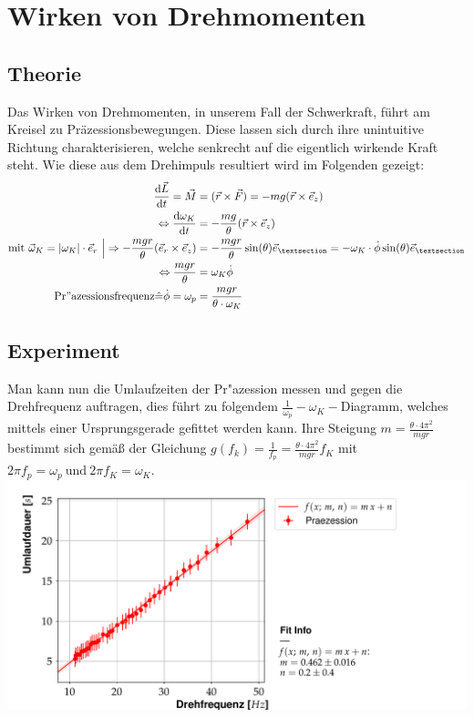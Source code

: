 \documentclass{include/protokollclass}
\begin{document}
    \chapter{Wirken von Drehmomenten}
    
    \section{Theorie}
    Das Wirken von Drehmomenten, in unserem Fall der Schwerkraft, führt am Kreisel zu Präzessionsbewegungen. Diese lassen sich durch ihre unintuitive Richtung charakterisieren, welche senkrecht auf die eigentlich wirkende Kraft steht. Wie diese aus dem Drehimpuls resultiert wird im Folgenden gezeigt:
    \begin{align}\label{eq:praezission}
        \frac{\d \vec{L}}{\d t} = \vec{M} &= (\vec{r} \times \vec{F}) = -mg(\vec{r} \times \vec{e}_z) \\
        \Leftrightarrow \frac{\d \omega_K}{\d t} &= -\frac{mg}{\theta}(\vec{r} \times \vec{e}_z) \\
        \mathrm{mit\ } \vec{\omega}_K=|\omega_K|\cdot \vec{e}_r \ \Big\vert \Rightarrow -\frac{mgr}{\theta}(\vec{e}_r \times \vec{e}_z) &= -\frac{mgr}{\theta} \sin(\theta) \vec{e}_{§} = -\omega_K \cdot \dot\phi\sin(\theta)\vec{e}_§ \\
        \Leftrightarrow \frac{mgr}{\theta} &= \omega_K \dot\phi \\
        \mathrm{Pr"azessionsfrequenz}\hat{=} \dot\phi = \omega_p &= \frac{mgr}{\theta \cdot \omega_K}
    \end{align}
    \section{Experiment}
    Man kann nun die Umlaufzeiten der Pr"azession messen und gegen die Drehfrequenz auftragen, dies führt zu folgendem $\frac{1}{\omega_p}-\omega_K-$Diagramm, welches mittels einer Ursprungsgerade gefittet werden kann. Ihre Steigung $m= \frac{\theta \cdot 4 \pi^2}{mgr}$ bestimmt sich gemäß der Gleichung $g(f_k)=\frac{1}{f_p}=\frac{\theta \cdot 4 \pi^2}{mgr}f_K$ mit $2 \pi f_p = \omega_p \mathrm{\ und\ } 2\pi f_K = \omega_K$. \\
    \includegraphics[scale=0.5]{fig/kafe_praezession.pdf}
\end{document}
